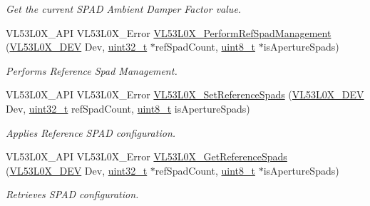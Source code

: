 \begin{DoxyCompactItemize}
\begin{DoxyCompactList}\small\item\em Get the current S\+P\+AD Ambient Damper Factor value. \end{DoxyCompactList}\item 
V\+L53\+L0\+X\+\_\+\+A\+PI V\+L53\+L0\+X\+\_\+\+Error \hyperlink{group__VL53L0X__SPADfunctions__group_ga70e6eb20975784b72296874674a57bbb}{V\+L53\+L0\+X\+\_\+\+Perform\+Ref\+Spad\+Management} (\hyperlink{group__VL53L0X__platform__group_ga2d6405308b1dd524b462f1b8fb97d167}{V\+L53\+L0\+X\+\_\+\+D\+EV} Dev, \hyperlink{vl53l0x__types_8h_a435d1572bf3f880d55459d9805097f62}{uint32\+\_\+t} $\ast$ref\+Spad\+Count, \hyperlink{vl53l0x__types_8h_aba7bc1797add20fe3efdf37ced1182c5}{uint8\+\_\+t} $\ast$is\+Aperture\+Spads)
\begin{DoxyCompactList}\small\item\em Performs Reference Spad Management. \end{DoxyCompactList}\item 
V\+L53\+L0\+X\+\_\+\+A\+PI V\+L53\+L0\+X\+\_\+\+Error \hyperlink{group__VL53L0X__SPADfunctions__group_ga663f1be502ca04ce6a1fea517c58d599}{V\+L53\+L0\+X\+\_\+\+Set\+Reference\+Spads} (\hyperlink{group__VL53L0X__platform__group_ga2d6405308b1dd524b462f1b8fb97d167}{V\+L53\+L0\+X\+\_\+\+D\+EV} Dev, \hyperlink{vl53l0x__types_8h_a435d1572bf3f880d55459d9805097f62}{uint32\+\_\+t} ref\+Spad\+Count, \hyperlink{vl53l0x__types_8h_aba7bc1797add20fe3efdf37ced1182c5}{uint8\+\_\+t} is\+Aperture\+Spads)
\begin{DoxyCompactList}\small\item\em Applies Reference S\+P\+AD configuration. \end{DoxyCompactList}\item 
V\+L53\+L0\+X\+\_\+\+A\+PI V\+L53\+L0\+X\+\_\+\+Error \hyperlink{group__VL53L0X__SPADfunctions__group_ga47d6d7d3c3d8baaadb136e5c57037899}{V\+L53\+L0\+X\+\_\+\+Get\+Reference\+Spads} (\hyperlink{group__VL53L0X__platform__group_ga2d6405308b1dd524b462f1b8fb97d167}{V\+L53\+L0\+X\+\_\+\+D\+EV} Dev, \hyperlink{vl53l0x__types_8h_a435d1572bf3f880d55459d9805097f62}{uint32\+\_\+t} $\ast$ref\+Spad\+Count, \hyperlink{vl53l0x__types_8h_aba7bc1797add20fe3efdf37ced1182c5}{uint8\+\_\+t} $\ast$is\+Aperture\+Spads)
\begin{DoxyCompactList}\small\item\em Retrieves S\+P\+AD configuration. \end{DoxyCompactList}\end{DoxyCompactItemize}


